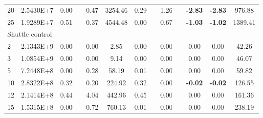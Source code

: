 {\begin{longtable}{@{}llccccccccccc@{}}
\multicolumn{1}{l|}{20} & \multicolumn{1}{l|}{2.5430E+7}  & 0.00 & \multicolumn{1}{c|}{}    & 0.47 & \multicolumn{1}{c|}{3254.46}  & 0.29 & \multicolumn{1}{c|}{}    & 1.26 & \multicolumn{1}{c|}{}    & \textbf{-2.83}  & \textbf{-2.83}  & 976.88  \\
\multicolumn{1}{l|}{25} & \multicolumn{1}{l|}{1.9289E+7}  & 0.51 & \multicolumn{1}{c|}{}    & 0.37 & \multicolumn{1}{c|}{4544.48}  & 0.00 & \multicolumn{1}{c|}{}    & 0.67 & \multicolumn{1}{c|}{}    & \textbf{-1.03}  & \textbf{-1.02}  & 1389.41 \\ \hline
\multicolumn{13}{l}{Shuttle control}                                                                                                                                                                                                                 \\ \hline
\multicolumn{1}{l|}{2}  & \multicolumn{1}{l|}{2.1343E+9}  & 0.00 & \multicolumn{1}{c|}{}    & 0.00 & \multicolumn{1}{c|}{2.85}     & 0.00 & \multicolumn{1}{c|}{}    & 0.00 & \multicolumn{1}{c|}{}    & 0.00            & 0.00            & 42.26   \\
\multicolumn{1}{l|}{3}  & \multicolumn{1}{l|}{1.0854E+9}  & 0.00 & \multicolumn{1}{c|}{}    & 0.00 & \multicolumn{1}{c|}{9.14}     & 0.00 & \multicolumn{1}{c|}{}    & 0.00 & \multicolumn{1}{c|}{}    & 0.00            & 0.00            & 46.07   \\
\multicolumn{1}{l|}{5}  & \multicolumn{1}{l|}{7.2448E+8}  & 0.00 & \multicolumn{1}{c|}{}    & 0.28 & \multicolumn{1}{c|}{58.19}    & 0.01 & \multicolumn{1}{c|}{}    & 0.00 & \multicolumn{1}{c|}{}    & 0.00            & 0.00            & 59.82   \\
\multicolumn{1}{l|}{10} & \multicolumn{1}{l|}{2.8322E+8}  & 0.32 & \multicolumn{1}{c|}{}    & 0.20 & \multicolumn{1}{c|}{224.92}   & 0.32 & \multicolumn{1}{c|}{}    & 0.00 & \multicolumn{1}{c|}{}    & \textbf{-0.02}  & \textbf{-0.02}  & 126.55  \\
\multicolumn{1}{l|}{12} & \multicolumn{1}{l|}{2.1414E+8}  & 0.44 & \multicolumn{1}{c|}{}    & 4.04 & \multicolumn{1}{c|}{442.96}   & 0.45 & \multicolumn{1}{c|}{}    & 0.00 & \multicolumn{1}{c|}{}    & 0.00            & 0.00            & 161.36  \\
\multicolumn{1}{l|}{15} & \multicolumn{1}{l|}{1.5315E+8}  & 0.00 & \multicolumn{1}{c|}{}    & 0.72 & \multicolumn{1}{c|}{760.13}   & 0.01 & \multicolumn{1}{c|}{}    & 0.00 & \multicolumn{1}{c|}{}    & 0.00            & 0.00            & 238.19  \\

\end{longtable}}
